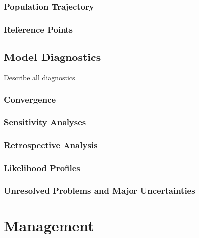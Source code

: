 \documentclass[11pt,
  english,
  letterpaper,
]{article}
\begin{document}
\hypertarget{population-trajectory}{%
\subsubsection{Population Trajectory}\label{population-trajectory}}

\hypertarget{reference-points-1}{%
\subsubsection{Reference Points}\label{reference-points-1}}

\hypertarget{model-diagnostics}{%
\subsection{Model Diagnostics}\label{model-diagnostics}}

Describe all diagnostics

\hypertarget{convergence}{%
\subsubsection{Convergence}\label{convergence}}

\hypertarget{sensitivity-analyses}{%
\subsubsection{Sensitivity Analyses}\label{sensitivity-analyses}}

\hypertarget{retrospective-analysis}{%
\subsubsection{Retrospective Analysis}\label{retrospective-analysis}}

\hypertarget{likelihood-profiles}{%
\subsubsection{Likelihood Profiles}\label{likelihood-profiles}}

\hypertarget{unresolved-problems-and-major-uncertainties-1}{%
\subsubsection{Unresolved Problems and Major Uncertainties}\label{unresolved-problems-and-major-uncertainties-1}}

\hypertarget{management}{%
\section{Management}\label{management}}
\end{document}
